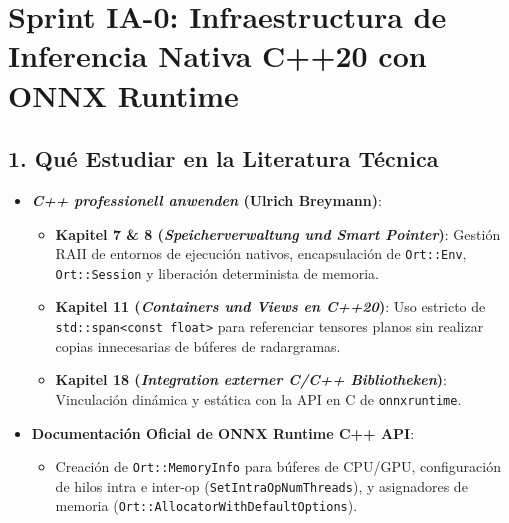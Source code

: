 \documentclass[11pt,a4paper]{article}
\begin{document}
\section{Sprint IA-0: Infraestructura de Inferencia Nativa C++20 con ONNX Runtime}

\subsection{1. Qu{\'e} Estudiar en la Literatura T{\'e}cnica}
\begin{itemize}
    \item \textbf{\textit{C++ professionell anwenden} (Ulrich Breymann)}:
    \begin{itemize}
        \item \textbf{Kapitel 7 \& 8 (\textit{Speicherverwaltung und Smart Pointer})}: Gesti{\'o}n RAII de entornos de ejecuci{\'o}n nativos, encapsulaci{\'o}n de \texttt{Ort::Env}, \texttt{Ort::Session} y liberaci{\'o}n determinista de memoria.
        \item \textbf{Kapitel 11 (\textit{Containers und Views en C++20})}: Uso estricto de \texttt{std::span<const float>} para referenciar tensores planos sin realizar copias innecesarias de b{\'u}feres de radargramas.
        \item \textbf{Kapitel 18 (\textit{Integration externer C/C++ Bibliotheken})}: Vinculaci{\'o}n din{\'a}mica y est{\'a}tica con la API en C de \texttt{onnxruntime}.
    \end{itemize}
    \item \textbf{Documentaci{\'o}n Oficial de ONNX Runtime C++ API}:
    \begin{itemize}
        \item Creaci{\'o}n de \texttt{Ort::MemoryInfo} para b{\'u}feres de CPU/GPU, configuraci{\'o}n de hilos intra e inter-op (\texttt{SetIntraOpNumThreads}), y asignadores de memoria (\texttt{Ort::AllocatorWithDefaultOptions}).
    \end{itemize}
\end{itemize}
\end{document}
